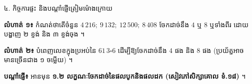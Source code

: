 \documentclass[10pt,a4paper]{article}
\begin{document}
\vspace{4pt}
\begin{tcolorbox}[
  enhanced, sharp corners, colback=white, colframe=black, boxrule=0.95pt,
  left=8pt, right=8pt, top=4pt, bottom=4pt, boxsep=1pt
]
  {\muol\fontsize{9.2pt}{13pt}\selectfont ៤. កិច្ចការផ្ទះ និងបណ្ដាំផ្ញើត្រៀមម៉ោងក្រោយ}
  \begin{wlist}
    \item \textbf{លំហាត់ ១៖} កំណត់ថាតើចំនួន $4\,216;\ 9\,132;\ 12\,500;\ 8\,408$ ចែកដាច់នឹង $4$ ឬ $8$ ឬទាំងពីរ ដោយបង្ហាញ ២ ខ្ទង់ និង ៣ ខ្ទង់ចុង ។
    \item \textbf{លំហាត់ ២៖} បំពេញលេខក្នុងប្រអប់នៃ $61\,3\square 6$ ដើម្បីឱ្យចែកដាច់នឹង $4$ ផង និង $8$ ផង (ប្រយ័ត្នអាចមានច្រើនជាង ១ ចម្លើយ) ។
    \item \textbf{បណ្ដាំផ្ញើ៖} អានមុន \textbf{១.២ លក្ខណៈចែកដាច់នៃផលបូកនិងផលដក (សៀវភៅសិក្សាគោល ទំ.១៨)} ។
  \end{wlist}
\end{tcolorbox}
\end{document}
